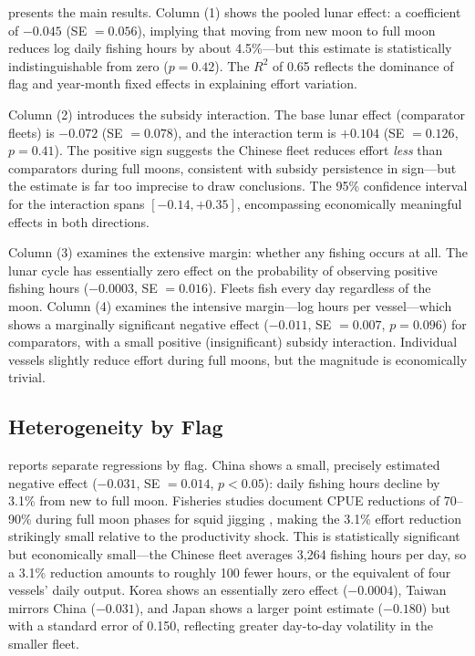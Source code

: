 \documentclass[12pt]{article}
\begin{document}


 presents the main results. Column (1) shows the pooled lunar effect: a coefficient of $-0.045$ (SE $= 0.056$), implying that moving from new moon to full moon reduces log daily fishing hours by about 4.5\%---but this estimate is statistically indistinguishable from zero ($p = 0.42$). The $R^2$ of 0.65 reflects the dominance of flag and year-month fixed effects in explaining effort variation.

Column (2) introduces the subsidy interaction. The base lunar effect (comparator fleets) is $-0.072$ (SE $= 0.078$), and the interaction term is $+0.104$ (SE $= 0.126$, $p = 0.41$). The positive sign suggests the Chinese fleet reduces effort \textit{less} than comparators during full moons, consistent with subsidy persistence in sign---but the estimate is far too imprecise to draw conclusions. The 95\% confidence interval for the interaction spans $[-0.14, +0.35]$, encompassing economically meaningful effects in both directions.

Column (3) examines the extensive margin: whether any fishing occurs at all. The lunar cycle has essentially zero effect on the probability of observing positive fishing hours ($-0.0003$, SE $= 0.016$). Fleets fish every day regardless of the moon. Column (4) examines the intensive margin---log hours per vessel---which shows a marginally significant negative effect ($-0.011$, SE $= 0.007$, $p = 0.096$) for comparators, with a small positive (insignificant) subsidy interaction. Individual vessels slightly reduce effort during full moons, but the magnitude is economically trivial.

\subsection{Heterogeneity by Flag}



 reports separate regressions by flag. China shows a small, precisely estimated negative effect ($-0.031$, SE $= 0.014$, $p < 0.05$): daily fishing hours decline by 3.1\% from new to full moon. Fisheries studies document CPUE reductions of 70--90\% during full moon phases for squid jigging \citep{niu2024}, making the 3.1\% effort reduction strikingly small relative to the productivity shock. This is statistically significant but economically small---the Chinese fleet averages 3,264 fishing hours per day, so a 3.1\% reduction amounts to roughly 100 fewer hours, or the equivalent of four vessels' daily output. Korea shows an essentially zero effect ($-0.0004$), Taiwan mirrors China ($-0.031$), and Japan shows a larger point estimate ($-0.180$) but with a standard error of 0.150, reflecting greater day-to-day volatility in the smaller fleet.
\end{document}
